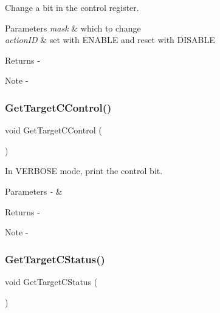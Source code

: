 Change a bit in the control register. 


\begin{DoxyParams}{Parameters}
{\em mask} & which to change \\
\hline
{\em action\+ID} & set with E\+N\+A\+B\+LE and reset with D\+I\+S\+A\+B\+LE\\
\hline
\end{DoxyParams}
\begin{DoxyReturn}{Returns}
-\/
\end{DoxyReturn}
\begin{DoxyNote}{Note}
-\/ 
\end{DoxyNote}
\mbox{\label{_t_a_r_g_e_t_c___register_map_8h_a94d4774c370e66c8f467fb25ba84ac0e}} 
\subsubsection{GetTargetCControl()}
{\footnotesize\ttfamily void Get\+Target\+C\+Control (\begin{DoxyParamCaption}{ }\end{DoxyParamCaption})}



In V\+E\+R\+B\+O\+SE mode, print the control bit. 


\begin{DoxyParams}{Parameters}
{\em -\/} & \\
\hline
\end{DoxyParams}
\begin{DoxyReturn}{Returns}
-\/
\end{DoxyReturn}
\begin{DoxyNote}{Note}
-\/ 
\end{DoxyNote}
\mbox{\label{_t_a_r_g_e_t_c___register_map_8h_a0d2306afc10a029a7860a9397c4a168d}} 
\subsubsection{GetTargetCStatus()}
{\footnotesize\ttfamily void Get\+Target\+C\+Status (\begin{DoxyParamCaption}{ }\end{DoxyParamCaption})}



